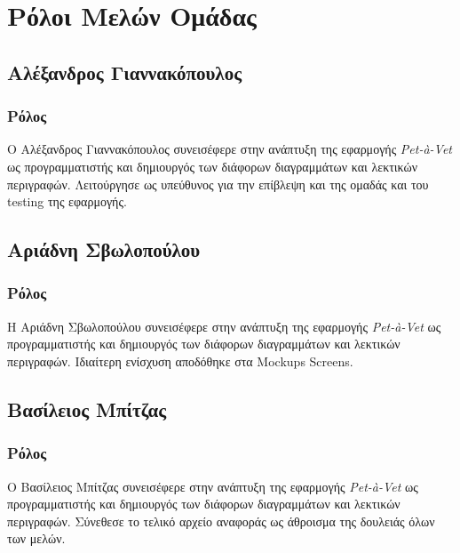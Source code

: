 \documentclass[12pt,a4paper,twoside]{book}
\renewcommand{\headrulewidth}{0pt} %
\renewcommand{\headrulewidth}{0pt}
\let\oldtableofcontents\tableofcontents
\renewcommand{\tableofcontents}{%
    \clearpage
    \thispagestyle{empty}
    \pagestyle{tocstyle}
    \oldtableofcontents %
    \clearpage
    \pagestyle{fancy}
    \fancyhead[LE]{\thepage} %
    \fancyhead[CE]{\leftmark} %
    \fancyhead[RE]{ΚΕΦ. \thechapter} %

    \fancyhead[LO]{\thesection} %
    \fancyhead[CO]{\rightmark} %
    \fancyhead[RO]{\thepage} %

    \renewcommand{\headrulewidth}{0.4pt} %

    \renewcommand{\chaptermark}[1]{\markboth{##1}{}}
    \renewcommand{\sectionmark}[1]{\markright{##1}}
}
\begin{document}
\tableofcontents

\printindex

\chapter{Ρόλοι Μελών Ομάδας} %

\section{Αλέξανδρος Γιαννακόπουλος} %

\subsection{Ρόλος}

Ο Αλέξανδρος Γιαννακόπουλος συνεισέφερε στην ανάπτυξη της εφαρμογής \textit{Pet-à-Vet} ως προγραμματιστής και δημιουργός των διάφορων διαγραμμάτων και λεκτικών περιγραφών. Λειτούργησε ως υπεύθυνος για την επίβλεψη και της ομαδάς και του testing της εφαρμογής. %

\section{Αριάδνη Σβωλοπούλου} %

\subsection{Ρόλος}

Η Αριάδνη Σβωλοπούλου συνεισέφερε στην ανάπτυξη της εφαρμογής \textit{Pet-à-Vet} ως προγραμματιστής και δημιουργός των διάφορων διαγραμμάτων και λεκτικών περιγραφών. Ιδιαίτερη ενίσχυση αποδόθηκε στα Mockups Screens. %

\section{Βασίλειος Μπίτζας}

\subsection{Ρόλος}

Ο Βασίλειος Μπίτζας συνεισέφερε στην ανάπτυξη της εφαρμογής \textit{Pet-à-Vet} ως προγραμματιστής και δημιουργός των διάφορων διαγραμμάτων και λεκτικών περιγραφών. Σύνεθεσε το τελικό αρχείο αναφοράς ως άθροισμα της δουλειάς όλων των μελών. %
\end{document}
